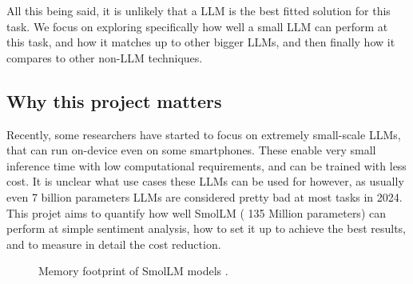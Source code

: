 \documentclass[10pt,twocolumn,letterpaper]{article}
\begin{document}
All this being said, it is unlikely that a LLM is the best fitted solution for this task. We focus on exploring specifically how well a small LLM can perform at this task, and how it matches up to other bigger LLMs, and then finally how it compares to other non-LLM techniques.




\subsection{Why this project matters}
Recently, some researchers have started to focus on extremely small-scale LLMs, that can run on-device even on some smartphones. These enable very small inference time with low computational requirements, and can be trained with less cost. It is unclear what use cases these LLMs can be used for however, as usually even 7 billion parameters LLMs are considered pretty bad at most tasks in 2024.
This projet aims to quantify how well SmolLM ( 135 Million parameters) can perform at simple sentiment analysis, how to set it up to achieve the best results, and to measure in detail the cost reduction.

\begin{figure}[t]
\begin{center}
\end{center}
   \caption{Memory footprint of SmolLM models \cite{hf-smollm-usecase}.}
\label{fig:smollm-memory}
\end{figure}
\end{document}
